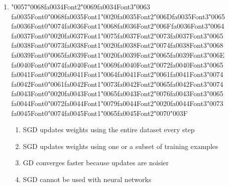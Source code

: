 \documentclass[12pt]{article}
\begin{document}
\begin{enumerate}[label=Q\arabic*.]
\item {\char"0057}{\char"0068}{\csname fa0034Font2\endcsname\char"0069}{\csname fa0034Font3\endcsname\char"0063} {\csname fa0035Font0\endcsname\char"0068}{\csname fa0035Font1\endcsname\char"0020}{\csname fa0035Font2\endcsname\char"006D}{\csname fa0035Font3\endcsname\char"0065} {\csname fa0036Font0\endcsname\char"0074}{\csname fa0036Font1\endcsname\char"0068}{\csname fa0036Font2\endcsname\char"006F}{\csname fa0036Font3\endcsname\char"0064} {\csname fa0037Font0\endcsname\char"0020}{\csname fa0037Font1\endcsname\char"0075}{\csname fa0037Font2\endcsname\char"0073}{\csname fa0037Font3\endcsname\char"0065} {\csname fa0038Font0\endcsname\char"0073}{\csname fa0038Font1\endcsname\char"0020}{\csname fa0038Font2\endcsname\char"0074}{\csname fa0038Font3\endcsname\char"0068} {\csname fa0039Font0\endcsname\char"0065}{\csname fa0039Font1\endcsname\char"0020}{\csname fa0039Font2\endcsname\char"0065}{\csname fa0039Font3\endcsname\char"006E} {\csname fa0040Font0\endcsname\char"0074}{\csname fa0040Font1\endcsname\char"0069}{\csname fa0040Font2\endcsname\char"0072}{\csname fa0040Font3\endcsname\char"0065} {\csname fa0041Font0\endcsname\char"0020}{\csname fa0041Font1\endcsname\char"0064}{\csname fa0041Font2\endcsname\char"0061}{\csname fa0041Font3\endcsname\char"0074} {\csname fa0042Font0\endcsname\char"0061}{\csname fa0042Font1\endcsname\char"0073}{\csname fa0042Font2\endcsname\char"0065}{\csname fa0042Font3\endcsname\char"0074} {\csname fa0043Font0\endcsname\char"0020}{\csname fa0043Font1\endcsname\char"0065}{\csname fa0043Font2\endcsname\char"0076}{\csname fa0043Font3\endcsname\char"0065} {\csname fa0044Font0\endcsname\char"0072}{\csname fa0044Font1\endcsname\char"0079}{\csname fa0044Font2\endcsname\char"0020}{\csname fa0044Font3\endcsname\char"0073} {\csname fa0045Font0\endcsname\char"0074}{\csname fa0045Font1\endcsname\char"0065}{\csname fa0045Font2\endcsname\char"0070}{\char"003F}
\begin{enumerate}[label=(\Alph*)]
    \item SGD updates weights using the entire dataset every step
    \item SGD updates weights using one or a subset of training examples
    \item GD converges faster because updates are noisier
    \item SGD cannot be used with neural networks
\end{enumerate}

\end{enumerate}
\end{document}
